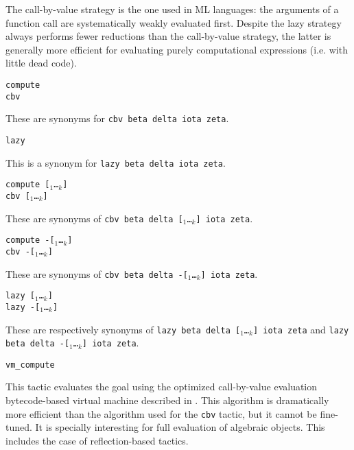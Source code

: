 \begin{coq_example*}
The call-by-value strategy is the one used in ML languages: the
arguments of a function call are systematically weakly evaluated
first. Despite the lazy strategy always performs fewer reductions than
the call-by-value strategy, the latter is generally more efficient for
evaluating purely computational expressions (i.e. with little dead code).

\begin{Variants}
\item {\tt compute} \\
      {\tt cbv}

  These are synonyms for {\tt cbv beta delta iota zeta}.

\item {\tt lazy}

  This is a synonym for {\tt lazy beta delta iota zeta}.

\item {\tt compute [\qualid$_1$\ldots\qualid$_k$]}\\
      {\tt cbv [\qualid$_1$\ldots\qualid$_k$]}

  These are synonyms of {\tt cbv beta delta
  [\qualid$_1$\ldots\qualid$_k$] iota zeta}.

\item {\tt compute -[\qualid$_1$\ldots\qualid$_k$]}\\
      {\tt cbv -[\qualid$_1$\ldots\qualid$_k$]}

  These are synonyms of {\tt cbv beta delta
  -[\qualid$_1$\ldots\qualid$_k$] iota zeta}.

\item {\tt lazy [\qualid$_1$\ldots\qualid$_k$]}\\
      {\tt lazy -[\qualid$_1$\ldots\qualid$_k$]}

  These are respectively synonyms of {\tt lazy beta delta
  [\qualid$_1$\ldots\qualid$_k$] iota zeta} and {\tt lazy beta delta
  -[\qualid$_1$\ldots\qualid$_k$] iota zeta}.

\item {\tt vm\_compute} 

  This tactic evaluates the goal using the optimized call-by-value evaluation
  bytecode-based virtual machine described in
  \cite{CompiledStrongReduction}. This algorithm is dramatically more efficient
  than the algorithm used for the {\tt cbv} tactic, but it cannot be
  fine-tuned. It is specially interesting for full evaluation of algebraic
  objects. This includes the case of reflection-based tactics.


\end{Variants}
\end{coq_example*}
